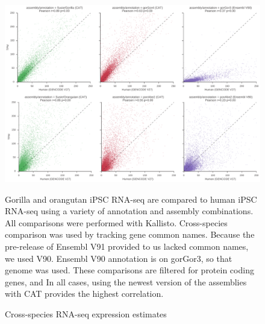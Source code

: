\documentclass[fleqn,10pt]{wlscirep}
\begin{document}
\begin{figure}
\includegraphics[width=0.8\paperwidth,keepaspectratio]{orang-gorilla-cross-species.pdf}
\caption{Cross-species RNA-seq expression estimates}

Gorilla and orangutan iPSC RNA-seq are compared to human iPSC RNA-seq using a variety of annotation and assembly combinations. All comparisons were performed with Kallisto. Cross-species comparison was used by tracking gene common names. Because the pre-release of Ensembl V91 provided to us lacked common names, we used V90. Ensembl V90 annotation is on gorGor3, so that genome was used. These comparisons are filtered for protein coding genes, and In all cases, using the newest version of the assemblies with CAT provides the highest correlation.
\label{supp_fig:primate_expression}
\end{figure}
\end{document}
